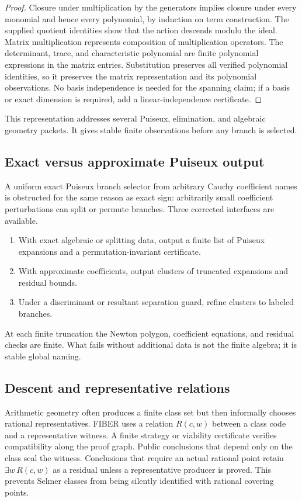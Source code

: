 \begin{proof}
Closure under multiplication by the generators implies closure under every
monomial and hence every polynomial, by induction on term construction.  The
supplied quotient identities show that the action descends modulo the ideal.
Matrix multiplication represents composition of multiplication operators.
The determinant, trace, and characteristic polynomial are finite polynomial
expressions in the matrix entries.  Substitution preserves all verified
polynomial identities, so it preserves the matrix representation and its
polynomial observations.  No basis independence is needed for the spanning
claim; if a basis or exact dimension is required, add a linear-independence
certificate.
\end{proof}

This representation addresses several Puiseux, elimination, and algebraic
geometry packets.  It gives stable finite observations before any branch is
selected.

\subsection{Exact versus approximate Puiseux output}

A uniform exact Puiseux branch selector from arbitrary Cauchy coefficient
names is obstructed for the same reason as exact sign: arbitrarily small
coefficient perturbations can split or permute branches.  Three corrected
interfaces are available.

\begin{enumerate}
\item With exact algebraic or splitting data, output a finite list of Puiseux
      expansions and a permutation-invariant certificate.
\item With approximate coefficients, output clusters of truncated expansions
      and residual bounds.
\item Under a discriminant or resultant separation guard, refine clusters to
      labeled branches.
\end{enumerate}

At each finite truncation the Newton polygon, coefficient equations, and
residual checks are finite.  What fails without additional data is not the
finite algebra; it is stable global naming.

\subsection{Descent and representative relations}

Arithmetic geometry often produces a finite class set but then informally
chooses rational representatives.  FIBER uses a relation
\(R(c,w)\) between a class code and a representative witness.  A finite
strategy or viability certificate verifies compatibility along the proof
graph.  Public conclusions that depend only on the class seal the witness.
Conclusions that require an actual rational point retain
\(\exists w\,R(c,w)\) as a residual unless a representative producer is
proved.  This prevents Selmer classes from being silently identified with
rational covering points.
